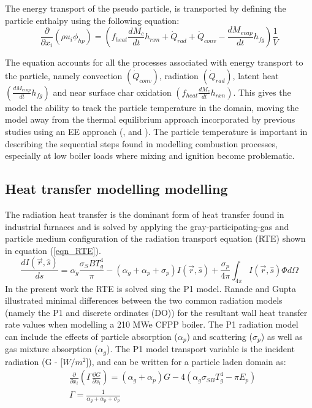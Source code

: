 \documentclass[review]{elsarticle}
\begin{document}
The energy transport of the pseudo particle, is transported by defining the particle enthalpy using the following equation:
\begin{equation}\label{eqn_phi_hp}
\frac{\partial}{\partial x_{i}}(\rho u_{i} \phi_{hp})=\left(f_{heat}\frac{dM_{c}}{dt}h_{rxn} + \dot{Q}_{rad} + \dot{Q}_{conv} - \frac{dM_{evap}}{dt}h_{fg}\right)\frac{1}{V}
\end{equation}

The equation accounts for all the processes associated with energy transport to the particle, namely convection $\left(\dot{Q}_{conv}\right)$, radiation $\left(\dot{Q}_{rad}\right)$, latent heat $\left(\frac{dM_{evap}}{dt}h_{fg}\right)$ and near surface char oxidation $\left(f_{heat}\frac{dM_{c}}{dt}h_{rxn}\right)$. This gives the model the ability to track the particle temperature in the domain, moving the model away from the thermal equilibrium approach incorporated by previous studies using an EE approach (\cite{Benim2005}, \cite{Vicente2003} and \cite{Cai2015}). The particle temperature is important in describing the sequential steps found in modelling combustion processes, especially at low boiler loads where mixing and ignition become problematic.

\subsection{Heat transfer modelling modelling}
The radiation heat transfer is the dominant form of heat transfer found in industrial furnaces \citep{Basu2000} and is solved by applying the gray-participating-gas and particle medium configuration of the radiation transport equation (RTE) \cite{Modest2013} shown in equation (\ref{eqn_RTE}).
\begin{equation}\label{eqn_RTE}
\frac{d I(\vec{r},\hat{s})}{ds} = \alpha_g \frac{\sigma_SB T_{g}^4}{\pi}-(\alpha_g+\alpha_p+\sigma_p)I(\vec{r},\hat{s}) + \frac{\sigma_p}{4\pi}\int_{4\pi}I(\vec{r},\hat{s})\Phi d \Omega
\end{equation}
In the present work the RTE is solved sing the P1 model. Ranade and Gupta \cite{Ranade2015} illustrated minimal differences between the two common radiation models (namely the P1 and discrete ordinates (DO)) for the resultant wall heat transfer rate values when modelling a 210 MWe CFPP boiler. The P1 radiation model can include the effects of particle absorption ($\alpha_p$) and scattering ($\sigma_p$) as well as gas mixture absorption ($\alpha_g$). The P1 model transport variable is the incident radiation (G - [$W/m^2$]), and can be written for a particle laden domain as:
\begin{equation}
\begin{split}
&\frac{\partial}{\partial x_{i}}\left(\Gamma\frac{\partial G}{\partial x_{i}}\right)=\left(\alpha_g+\alpha_p\right)G-4\left(\alpha_g \sigma_{SB} T_{g}^4-\pi E_p \right)\\
&\Gamma = \frac{1}{\alpha_g+\alpha_p+\sigma_p}
\end{split}
\end{equation}
\end{document}

